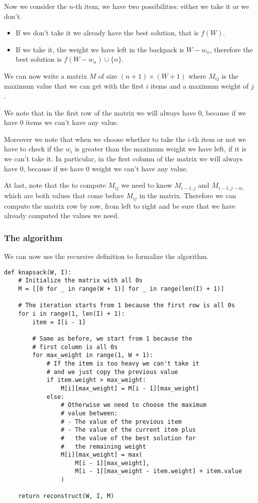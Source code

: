 \documentclass[14pt]{extarticle}
\begin{document}
Now we consider the $n$-th item, we have two possibilities: either we take it or we don't.
\begin{itemize}
    \item If we don't take it we already have the best solution, that is $f(W)$.
    \item If we take it, the weight we have left in the backpack is $W - w_n$, therefore the best solution is $f(W - w_n) \cup \{n\}$.
\end{itemize}

We can now write a matrix $M$ of size $(n + 1) \times (W + 1)$ where $M_{ij}$ is the maximum value that we can get with the first $i$ items and a maximum weight of $j$.

We note that in the first row of the matrix we will always have 0, because if we have 0 items we can't have any value.

Moreover we note that when we choose whether to take the $i$-th item or not we have to check if the $w_i$ is greater than the maximum weight we have left, if it is we can't take it.
In particular, in the first column of the matrix we will always have 0, because if we have 0 weight we can't have any value.

At last, note that the to compute $M_{ij}$ we need to know $M_{i-1, j}$ and $M_{i-1, j - w_i}$ which are both values that come before $M_{ij}$ in the matrix.
Therefore we can compute the matrix row by row, from left to right and be sure that we have already computed the values we need.

\subsubsection{The algorithm}

We can now use the recursive definition to formalize the algorithm.

\begin{verbatim}
def knapsack(W, I):
    # Initialize the matrix with all 0s
    M = [[0 for _ in range(W + 1)] for _ in range(len(I) + 1)]

    # The iteration starts from 1 because the first row is all 0s
    for i in range(1, len(I) + 1):
        item = I[i - 1]

        # Same as before, we start from 1 because the 
        # first column is all 0s
        for max_weight in range(1, W + 1):
            # If the item is too heavy we can't take it
            # and we just copy the previous value
            if item.weight > max_weight:
                M[i][max_weight] = M[i - 1][max_weight]
            else:
                # Otherwise we need to choose the maximum
                # value between:
                # - The value of the previous item
                # - The value of the current item plus
                #   the value of the best solution for
                #   the remaining weight
                M[i][max_weight] = max(
                    M[i - 1][max_weight],
                    M[i - 1][max_weight - item.weight] + item.value
                )

    return reconstruct(W, I, M)
\end{verbatim}
\end{document}
